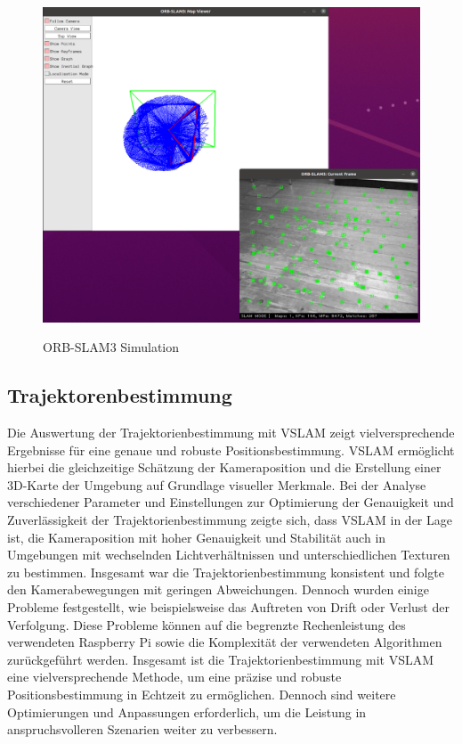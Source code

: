 \begin{figure}
    \includegraphics{images/orbslam3_simulation}
    \label{fig:orbslam3}
    \caption{ORB-SLAM3 Simulation}
\end{figure}

\subsection{Trajektorenbestimmung}
Die Auswertung der Trajektorienbestimmung mit \ac{VSLAM} zeigt vielversprechende Ergebnisse für eine genaue und robuste Positionsbestimmung. \ac{VSLAM} ermöglicht hierbei die gleichzeitige Schätzung der Kameraposition und die Erstellung einer 3D-Karte der Umgebung auf Grundlage visueller Merkmale. Bei der Analyse verschiedener Parameter und Einstellungen zur Optimierung der Genauigkeit und Zuverlässigkeit der Trajektorienbestimmung zeigte sich, dass \ac{VSLAM} in der Lage ist, die Kameraposition mit hoher Genauigkeit und Stabilität auch in Umgebungen mit wechselnden Lichtverhältnissen und unterschiedlichen Texturen zu bestimmen. Insgesamt war die Trajektorienbestimmung konsistent und folgte den Kamerabewegungen mit geringen Abweichungen. Dennoch wurden einige Probleme festgestellt, wie beispielsweise das Auftreten von Drift oder Verlust der Verfolgung. Diese Probleme können auf die begrenzte Rechenleistung des verwendeten Raspberry Pi sowie die Komplexität der verwendeten Algorithmen zurückgeführt werden. Insgesamt ist die Trajektorienbestimmung mit \ac{VSLAM} eine vielversprechende Methode, um eine präzise und robuste Positionsbestimmung in Echtzeit zu ermöglichen. Dennoch sind weitere Optimierungen und Anpassungen erforderlich, um die Leistung in anspruchsvolleren Szenarien weiter zu verbessern.
